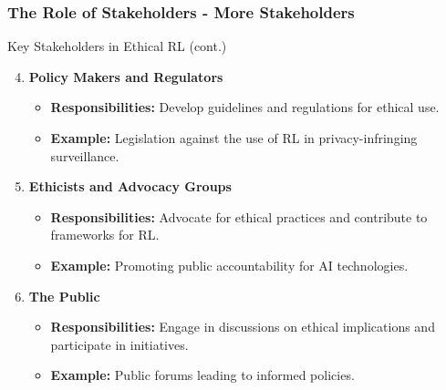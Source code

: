 \documentclass[aspectratio=169]{beamer}
\begin{document}
\begin{frame}[fragile]
    \frametitle{The Role of Stakeholders - More Stakeholders}
    \begin{block}{Key Stakeholders in Ethical RL (cont.)}
        \begin{enumerate}
            \setcounter{enumi}{3}
            \item \textbf{Policy Makers and Regulators}
                \begin{itemize}
                    \item \textbf{Responsibilities:} Develop guidelines and regulations for ethical use.
                    \item \textbf{Example:} Legislation against the use of RL in privacy-infringing surveillance.
                \end{itemize}
                
            \item \textbf{Ethicists and Advocacy Groups}
                \begin{itemize}
                    \item \textbf{Responsibilities:} Advocate for ethical practices and contribute to frameworks for RL.
                    \item \textbf{Example:} Promoting public accountability for AI technologies.
                \end{itemize}
                
            \item \textbf{The Public}
                \begin{itemize}
                    \item \textbf{Responsibilities:} Engage in discussions on ethical implications and participate in initiatives.
                    \item \textbf{Example:} Public forums leading to informed policies.
                \end{itemize}
        \end{enumerate}
    \end{block}
\end{frame}
\end{document}
